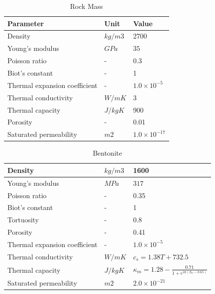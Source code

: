 \begin{table}[H]
\begin{center}
\begin{tabular}{lll}
\hline \hline
Parameter   &  Unit  & Value\\
\hline \hline
 Density &  $kg/m3$ &  2700 \\
\hline
 Young's modulus &  $GPa$ &  $35$ \\
\hline
 Poisson ratio & - &  0.3 \\
\hline
 Biot's constant & - &  1 \\
\hline
 Thermal expansion coefficient &  - &  $1.0
\times10^{-5}$ \\
\hline
 Thermal conductivity &  $W/mK$ &  3\\
\hline
 Thermal capacity &  $J/kgK$ &  900\\
\hline
 Porosity & - &  0.01 \\
\hline
 Saturated permeability &  $m2$  & $1.0
\times10^{-17}$ \\
\hline \hline
\end{tabular}
\end{center}
\caption{Rock Mass}
\label{tab:thm_rock}

\end{table}
\begin{table}[H]
\begin{center}
\begin{tabular}{lll}
\hline \hline
 Density &  $kg/m3$ &  1600 \\
\hline
 Young's modulus &  $MPa$ &  $317$\\
\hline
 Poisson ratio & - &  0.35 \\
\hline
 Biot's constant & - &  1 \\
\hline
Tortuosity &  - &  $0.8$ \\
\hline
 Porosity & - &  0.41 \\
\hline
 Thermal expansion coefficient &  - &  $1.0
\times10^{-5}$ \\
\hline
 Thermal conductivity &  $W/mK$ &  $c_s=1.38T+732.5$\\
\hline
 Thermal capacity &  $J/kgK$ &  $\kappa_m=1.28-\frac{0.71}{1+e^{10(S_w-0.65)}}$\\
\hline
 Saturated permeability &  $m2$  & $2.0
\times10^{-21}$ \\
\hline \hline
\end{tabular}
\end{center}
\caption{Bentonite}
\label{tab:thm_bentonite}
\end{table}

